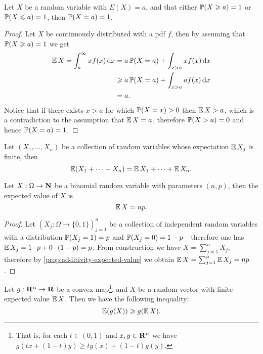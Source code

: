 \begin{proposition}
\label{prop:expectation-bound-prob-1}
Let \(X\) be a random variable with \(E(X) = a\), and that either \(\operatorname{\mathbb{P}}(X \geqslant a)
= 1\) or \(\operatorname{\mathbb{P}}(X \leqslant a) = 1\), then \(\operatorname{\mathbb{P}}(X = a) = 1\).
\end{proposition}

\begin{proof}
Let \(X\) be continuously distributed with a pdf \(f\), then by assuming that
\(\operatorname{\mathbb{P}}(X \geqslant a) = 1\) we get
\begin{align*}
  \operatorname{\mathbb{E}} X = \int_a^{\infty} x f(x)\, \mathrm{d} x
  &= a \operatorname{\mathbb{P}}(X = a) + \int_{x > a} x f(x)\, \mathrm{d} x \\
  &\geqslant a \operatorname{\mathbb{P}}(X = a) + \int_{x > a} a f(x)\, \mathrm{d} x \\
  &= a.
\end{align*}
Notice that if there exists \(x > a\) for which \(\operatorname{\mathbb{P}}(X = x) > 0\) then
\(\operatorname{\mathbb{E}} X > a\), which is a contradiction to the assumption that \(\operatorname{\mathbb{E}} X
= a\), therefore \(\operatorname{\mathbb{P}}(X > a) = 0\) and hence \(\operatorname{\mathbb{P}}(X = a) = 1\).
\end{proof}

\begin{proposition}
\label{prop:additivity-expected-value}
Let \((X_1, \dots, X_n)\) be a collection of random variables whose expectation
\(\operatorname{\mathbb{E}} X_j\) is finite, then
\[
\operatorname{\mathbb{E}}(X_1 + \dots + X_n) = \operatorname{\mathbb{E}} X_1 + \dots + \operatorname{\mathbb{E}} X_n.
\]
\end{proposition}

\begin{proposition}
\label{prop:mean-of-binomial-random-variable}
Let \(X: \Omega \to \mathbf{N}\) be a binomial random variable with parameters
\((n, p)\), then the expected value of \(X\) is
\[
\operatorname{\mathbb{E}} X = n p.
\]
\end{proposition}

\begin{proof}
Let \((X_j: \Omega \to \{0, 1\})_{j=1}^n\) be a collection of independent random
variables with a distribution \(\operatorname{\mathbb{P}}(X_j = 1) = p\) and
\(\operatorname{\mathbb{P}}(X_j = 0) = 1 - p\)---therefore one has
\(\operatorname{\mathbb{E}} X_j = 1 \cdot p + 0 \cdot (1 - p) = p\). From construction we have
\(X = \sum_{j=1}^n X_j\), therefore by \cref{prop:additivity-expected-value} we obtain
\(\operatorname{\mathbb{E}} X = \sum_{j=1}^n \operatorname{\mathbb{E}} X_j = n p\).
\end{proof}

\begin{theorem}
\label{thm:jensen-inequality-expected-value}
Let \(g: \mathbf{R}^n \to \mathbf{R}\) be a convex map\footnote{That is, for each \(t \in (0, 1)\) and
\(x, y \in \mathbf{R}^n\) we have \(g(t x + (1 - t) y) \geq t g(x) + (1 - t) g(y)\).}, and
\(X\) be a random vector
with finite expected value
\(\operatorname{\mathbb{E}} X\). Then we have the following inequality:
\[
\operatorname{\mathbb{E}}(g(X)) \geqslant g(\operatorname{\mathbb{E}} X ).
\]
\end{theorem}

